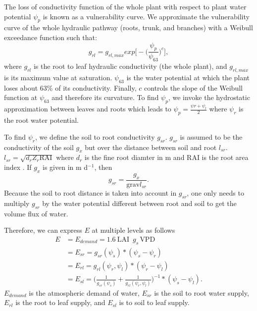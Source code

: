 \documentclass[utf8]{frontiersSCNS} %
\begin{document}
The loss of conductivity function of the whole plant with respect to plant water potential $\psi_p$ is known as a vulnerability curve. We approximate the vulnerability curve of the whole hydraulic pathway (roots, trunk, and branches) with a Weibull exceedance function such that:
\begin{equation}
    \label{eqn:root_leaf}
    g_{rl} = g_{rl,max}exp\Big[-\Big(\frac{\psi_{p}}{\psi_{63}}\Big)^c\Big],
\end{equation}
where $g_{rl}$ is the root to leaf hydraulic conductivity (the whole plant), and $g_{rl,max}$ is its maximum value at saturation. $\psi_{63}$ is the water potential at which the plant loses about 63\% of its conductivity. Finally, $c$ controls the slope of the Weibull function at $\psi_{63}$ and therefore its curvature. To find $\psi_{p}$, we invoke the hydrostatic approximation between leaves and roots which leads to $\psi_{p}=\frac{\psi{r}+\psi_l}{2}$ where $\psi_r$ is the root water potential.

To find $\psi_r$, we define the soil to root conductivity $g_{sr}$. $g_{sr}$ is assumed to be the conductivity of the soil $g_x$ but over the distance between soil and root $l_{sr}$. $l_{sr} = \sqrt{d_r Z_r \text{RAI}}$ where $d_r$ is the fine root diamter in m and RAI is the root area index \citep{Manzoni2013}. If $g_x$ is given in m d$^{-1}$, then
\begin{equation}
    \label{eqn:soil_root}
    g_{sr} = \frac{g_x}{\text{grav} l_{sr}}. 
\end{equation}
Because the soil to root distance is taken into account in $g_{sr}$, one only needs to multiply $g_{sr}$ by the water potential different between root and soil to get the volume flux of water.

Therefore, we can express $E$ at multiple levels as follows
\begin{equation}
    \label{eqn: mass_cons}
        \begin{split}
        E & = E_{demand} = 1.6\: \text{LAI }\, g_s\, \text{VPD} \\
        & = E_{sr} = g_{sr}(\psi_s)*(\psi_s - \psi_r)\\
        & = E_{rl} = g_{rl}(\psi_r,\psi_l)*(\psi_r - \psi_l) \\
        & = E_{sl} = \Bigg(\frac{1}{g_{sr}(\psi_s)} + \frac{1}{g_{rl}(\psi_r,\psi_l)}\Bigg)^{-1}*(\psi_s - \psi_l).
        \end{split}
\end{equation}
$E_{demand}$ is the atmospheric demand of water, $E_{sr}$ is the soil to root water supply, $E_{rl}$ is the root to leaf supply, and $E_{sl}$ is to soil to leaf supply.
\end{document}
